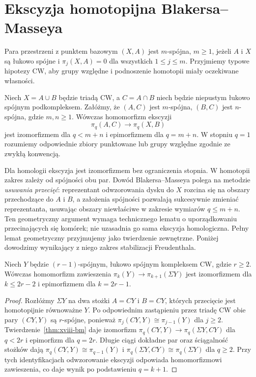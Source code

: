\section{Ekscyzja homotopijna Blakersa--Masseya}
\begin{definicja}
Para przestrzeni z punktem bazowym $(X,A)$ jest $m$-spójna,
$m\ge1$, jeżeli $A$ i $X$ są łukowo spójne i
$\pi_j(X,A)=0$ dla wszystkich $1\le j\le m$.
Przyjmiemy typowe hipotezy CW, aby grupy względne i
podnoszenie homotopii miały oczekiwane własności.
\end{definicja}
\begin{twierdzenie}
\label{thm:xviii-bm}
Niech $X=A\cup B$ będzie triadą CW, a $C=A\cap B$ niech
będzie niepustym łukowo spójnym podkompleksem.
Załóżmy, że $(A,C)$ jest $m$-spójna, $(B,C)$ jest
$n$-spójna, gdzie $m,n\ge1$.
Wówczas homomorfizm ekscyzji
\[
\pi_q(A,C)\longrightarrow\pi_q(X,B)
\]
jest izomorfizmem dla $q<m+n$ i epimorfizmem dla $q=m+n$.
W stopniu $q=1$ rozumiemy odpowiednie zbiory punktowane
lub grupy względne zgodnie ze zwykłą konwencją.
\end{twierdzenie}
\begin{uwaga}
Dla homologii ekscyzja jest izomorfizmem bez ograniczenia
stopnia. W homotopii zakres zależy od spójności obu par.
Dowód Blakersa--Masseya polega na metodzie \emph{usuwania
przecięć}: reprezentant odwzorowania dysku do $X$ rozcina
się na obszary przechodzące do $A$ i $B$, a założenia
spójności pozwalają sukcesywnie zmieniać reprezentanta,
usuwając obszary niewłaściwe w zakresie wymiarów
$q\le m+n$. Ten geometryczny argument wymaga
technicznego lematu o uporządkowaniu przecinających się
komórek; nie uzasadnia go sama ekscyzja homologiczna.
Pełny lemat geometryczny przyjmujemy jako twierdzenie
zewnętrzne. Poniżej dowodzimy wynikający z niego
zakres stabilizacji Freudenthala.
\end{uwaga}
\begin{wniosek}
\label{cor:xviii-freudenthal}
Niech $Y$ będzie $(r-1)$-spójnym, łukowo spójnym
kompleksem CW, gdzie $r\ge2$. Wówczas homomorfizm
zawieszenia
$\pi_k(Y)\to\pi_{k+1}(\Sigma Y)$ jest izomorfizmem
dla $k\le2r-2$ i epimorfizmem dla $k=2r-1$.
\end{wniosek}
\begin{proof}
Rozłóżmy $\Sigma Y$ na dwa stożki $A=CY$ i $B=CY$,
których przecięcie jest homotopijnie równoważne $Y$.
Po odpowiednim zastąpieniu przez triadę CW
obie pary $(CY,Y)$ są $r$-spójne, ponieważ
$\pi_j(CY,Y)\cong\pi_{j-1}(Y)$ dla $j\ge2$.
Twierdzenie~\ref{thm:xviii-bm} daje izomorfizm
$\pi_q(CY,Y)\to\pi_q(\Sigma Y,CY)$ dla $q<2r$
i epimorfizm dla $q=2r$.
Długie ciągi dokładne par oraz ściągalność stożków
dają $\pi_q(CY,Y)\cong\pi_{q-1}(Y)$ i
$\pi_q(\Sigma Y,CY)\cong\pi_q(\Sigma Y)$ dla $q\ge2$.
Przy tych identyfikacjach odwzorowanie ekscyzji odpowiada
homomorfizmowi zawieszenia, co daje wynik po podstawieniu
$q=k+1$.
\end{proof}
